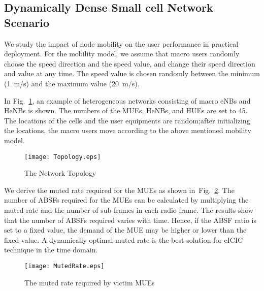 \documentclass[paper]{ieice}
\begin{document}
\subsection{Dynamically Dense Small cell Network Scenario}
\label{Eval-Dynamically}
We study the impact of node mobility on the user performance in practical deployment. For the mobility model, we assume that macro users randomly choose the speed direction and the speed value, and change their speed direction and value at any time. The speed value is chosen randomly between the minimum (1~m/s) and the maximum value (20~m/s).

In Fig.~\ref{Voronoi_Topo}, an example of heterogeneous networks consisting of macro eNBs and HeNBs is shown. The numbers of the MUEs, HeNBs, and HUEs are set to 45. The locations of the cells and the user equipments are random;after initializing the locations, the macro users move according to the above mentioned mobility model.
\begin{figure}[t]
  \centering
\texttt{[image: Topology.eps]}\\
  \caption{The Network Topology}\label{Voronoi_Topo}
\end{figure}

We derive the muted rate required for the MUEs as shown in~Fig.~\ref{M-MutedRate}. The number of ABSFs required for the MUEs can be calculated by multiplying the muted rate and the number of sub-frames in each radio frame. The results show that the number of ABSFs required varies with time. Hence, if the ABSF ratio is set to a fixed value, the demand of the MUE may be higher or lower than the fixed value. A dynamically optimal muted rate is the best solution for eICIC technique in the time domain.
\begin{figure}[t]
  \centering
\texttt{[image: MutedRate.eps]}\\
  \caption{The muted rate required by victim MUEs}\label{M-MutedRate}
\end{figure}
\end{document}
